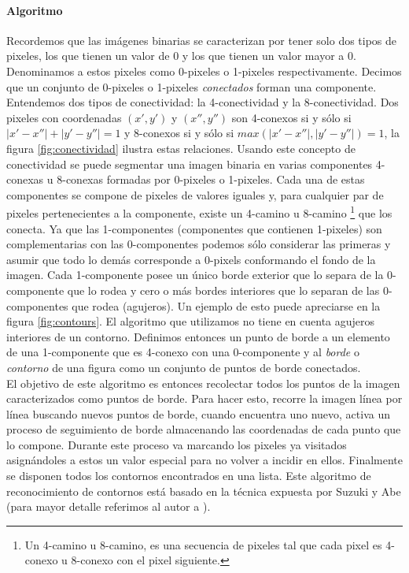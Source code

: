 	\paragraph{Algoritmo} 
	Recordemos que las imágenes binarias se caracterizan por tener solo 
	dos tipos de pixeles, los que tienen un valor de $0$ y los que tienen 
	un valor mayor a 0. Denominamos a estos pixeles como 
	0-pixeles o 1-pixeles respectivamente. Decimos que un conjunto de 
	0-pixeles o 1-pixeles \textit{conectados} forman una componente. Entendemos dos tipos de conectividad:
	la 4-conectividad y la 8-conectividad. Dos pixeles con coordenadas 
	$(x',y')$ y $(x'',y'')$ son 4-conexos si y sólo si 
	$|x' - x''| + |y'-y''| = 1$ y 8-conexos si y sólo si $max(|x'-x''|,|y'-y''|)=1$, la figura \ref{fig:conectividad} ilustra estas relaciones.
	Usando este concepto de conectividad se puede segmentar una imagen 
	binaria en varias componentes 4-conexas u 8-conexas formadas por 
	 0-pixeles o 1-pixeles. Cada una de estas
	componentes se compone de pixeles de valores iguales y, para cualquier 
	par de pixeles pertenecientes a la componente, existe un 
	4-camino u 8-camino \footnote{ Un 4-camino u 8-camino, es una secuencia 
	de pixeles tal que cada pixel es 4-conexo u 8-conexo con el pixel 
	siguiente.} que los
	conecta. Ya que las 1-componentes (componentes que contienen 
	1-pixeles) son complementarias con las 0-componentes podemos sólo considerar las primeras y asumir que todo
	lo demás corresponde a 0-pixels conformando el fondo de la imagen. Cada 
	1-componente posee un único borde exterior que lo separa de la 0-componente que lo rodea y cero o más bordes interiores que lo separan de las 0-componentes que rodea (agujeros). Un ejemplo de esto puede apreciarse
	en la figura \ref{fig:contours}. El algoritmo que utilizamos no tiene 
	en cuenta agujeros interiores de un contorno. Definimos entonces un 
	punto de borde a un elemento de una 1-componente que es 4-conexo con 
	una 0-componente y al \textit{borde} o \textit{contorno} de una figura 
	como un conjunto de puntos de borde conectados.\\
	\indent El objetivo de este algoritmo es entonces recolectar todos los 
	puntos de la imagen caracterizados como puntos de borde. Para 
	hacer esto, recorre la imagen línea por línea buscando nuevos puntos de borde, cuando encuentra
	uno nuevo, activa un proceso de seguimiento de borde almacenando las 
	coordenadas de cada punto que lo compone. Durante este proceso va 
	marcando los pixeles ya 
	visitados asignándoles a estos un valor especial para no volver a 
	incidir en ellos. Finalmente se disponen todos los contornos encontrados en una lista.
	Este algoritmo de reconocimiento de contornos está basado en la 
	técnica expuesta por Suzuki y Abe (para mayor detalle referimos al 
	autor a \cite{suzuki85}).
	
